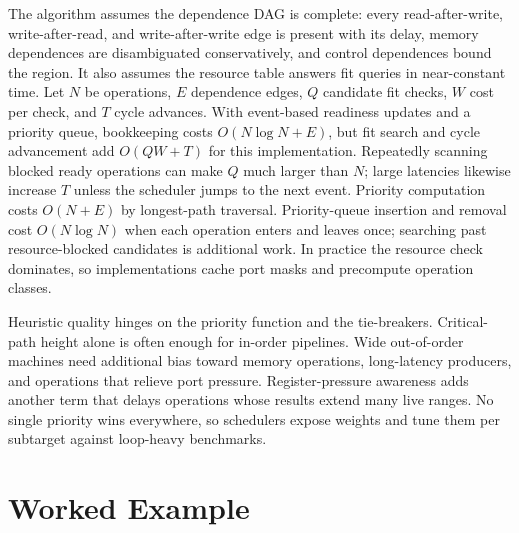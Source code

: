 The algorithm assumes the dependence DAG is complete: every read-after-write, write-after-read, and write-after-write edge is present with its delay, memory dependences are disambiguated conservatively, and control dependences bound the region.
It also assumes the resource table answers fit queries in near-constant time.
Let $N$ be operations, $E$ dependence edges, $Q$ candidate fit checks, $W$ cost per check, and $T$ cycle advances.
With event-based readiness updates and a priority queue, bookkeeping costs $O(N\log N+E)$, but fit search and cycle advancement add $O(QW+T)$ for this implementation.
Repeatedly scanning blocked ready operations can make $Q$ much larger than $N$; large latencies likewise increase $T$ unless the scheduler jumps to the next event.
Priority computation costs $O(N + E)$ by longest-path traversal.
Priority-queue insertion and removal cost $O(N\log N)$ when each operation enters and leaves once; searching past resource-blocked candidates is additional work.
In practice the resource check dominates, so implementations cache port masks and precompute operation classes.

Heuristic quality hinges on the priority function and the tie-breakers.
Critical-path height alone is often enough for in-order pipelines.
Wide out-of-order machines need additional bias toward memory operations, long-latency producers, and operations that relieve port pressure.
Register-pressure awareness adds another term that delays operations whose results extend many live ranges.
No single priority wins everywhere, so schedulers expose weights and tune them per subtarget against loop-heavy benchmarks.

\section{Worked Example}\label{sec:ch26-worked}

